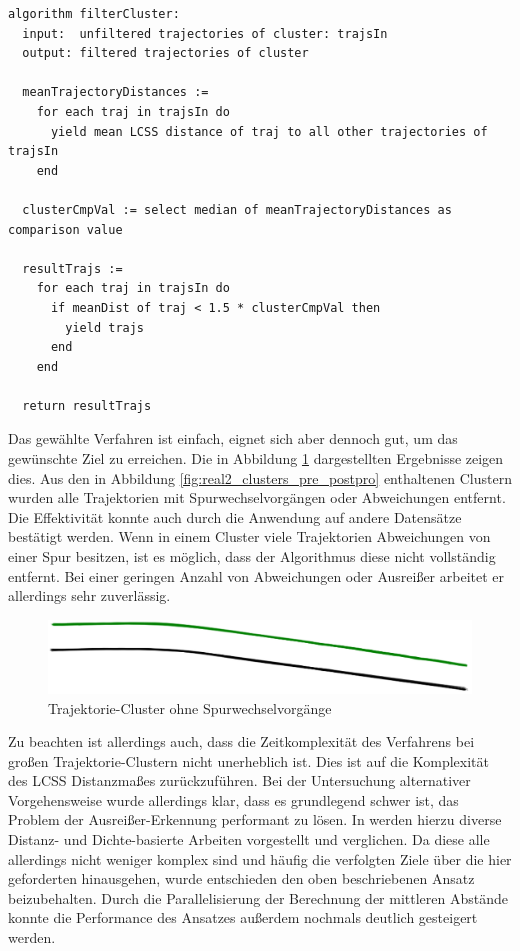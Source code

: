 \begin{lstlisting}[caption=Pseudocode Cluster Post-Processing, language=Pseudo, label=lst:pseudo_post_processing]
algorithm filterCluster:
  input:  unfiltered trajectories of cluster: trajsIn
  output: filtered trajectories of cluster

  meanTrajectoryDistances :=
    for each traj in trajsIn do
      yield mean LCSS distance of traj to all other trajectories of trajsIn
    end

  clusterCmpVal := select median of meanTrajectoryDistances as comparison value

  resultTrajs :=
    for each traj in trajsIn do
      if meanDist of traj < 1.5 * clusterCmpVal then
        yield trajs
      end
    end

  return resultTrajs
\end{lstlisting}

Das gewählte Verfahren ist einfach, eignet sich aber dennoch gut, um das gewünschte Ziel zu erreichen.
Die in Abbildung \ref{fig:real2_clusters_post_postpro} dargestellten Ergebnisse zeigen dies.
Aus den in Abbildung \ref{fig:real2_clusters_pre_postpro} enthaltenen Clustern wurden alle Trajektorien
mit Spurwechselvorgängen oder Abweichungen entfernt. Die Effektivität konnte auch durch die Anwendung
auf andere Datensätze bestätigt werden.
Wenn in einem Cluster viele Trajektorien Abweichungen von einer Spur besitzen, ist es möglich, dass der Algorithmus
diese nicht vollständig entfernt. Bei einer geringen Anzahl von Abweichungen oder Ausreißer arbeitet
er allerdings sehr zuverlässig.

\begin{figure}[H]
    \centering
    \includegraphics[width=0.8\linewidth]{resources/img/umsetzung/U2/Clusters_Post_Postprocessing}
    \caption{Trajektorie-Cluster ohne Spurwechselvorgänge}
    \label{fig:real2_clusters_post_postpro}
\end{figure}

Zu beachten ist allerdings auch, dass die Zeitkomplexität des Verfahrens bei großen Trajektorie-Clustern
nicht unerheblich ist. Dies ist auf die Komplexität des LCSS Distanzmaßes zurückzuführen.
Bei der Untersuchung alternativer Vorgehensweise wurde allerdings klar, dass es grundlegend schwer ist,
das Problem der Ausreißer-Erkennung performant zu lösen.
In \cite[]{Meng2018} werden hierzu diverse Distanz- und Dichte-basierte
Arbeiten vorgestellt und verglichen. Da diese alle allerdings nicht weniger komplex sind und häufig
die verfolgten Ziele über die hier geforderten hinausgehen, wurde entschieden den oben beschriebenen Ansatz
beizubehalten. Durch die Parallelisierung der Berechnung der mittleren Abstände konnte die Performance
des Ansatzes außerdem nochmals deutlich gesteigert werden.

